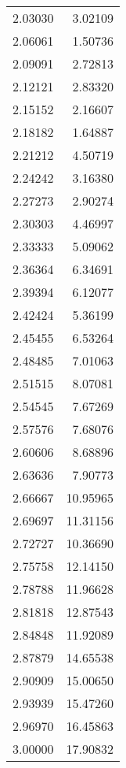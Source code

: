 \begin{longtable}[H]{rr}
2.03030 &         3.02109 \\
2.06061 &         1.50736 \\
2.09091 &         2.72813 \\
2.12121 &         2.83320 \\
2.15152 &         2.16607 \\
2.18182 &         1.64887 \\
2.21212 &         4.50719 \\
2.24242 &         3.16380 \\
2.27273 &         2.90274 \\
2.30303 &         4.46997 \\
2.33333 &         5.09062 \\
2.36364 &         6.34691 \\
2.39394 &         6.12077 \\
2.42424 &         5.36199 \\
2.45455 &         6.53264 \\
2.48485 &         7.01063 \\
2.51515 &         8.07081 \\
2.54545 &         7.67269 \\
2.57576 &         7.68076 \\
2.60606 &         8.68896 \\
2.63636 &         7.90773 \\
2.66667 &        10.95965 \\
2.69697 &        11.31156 \\
2.72727 &        10.36690 \\
2.75758 &        12.14150 \\
2.78788 &        11.96628 \\
2.81818 &        12.87543 \\
2.84848 &        11.92089 \\
2.87879 &        14.65538 \\
2.90909 &        15.00650 \\
2.93939 &        15.47260 \\
2.96970 &        16.45863 \\
3.00000 &        17.90832 \\
\end{longtable}
